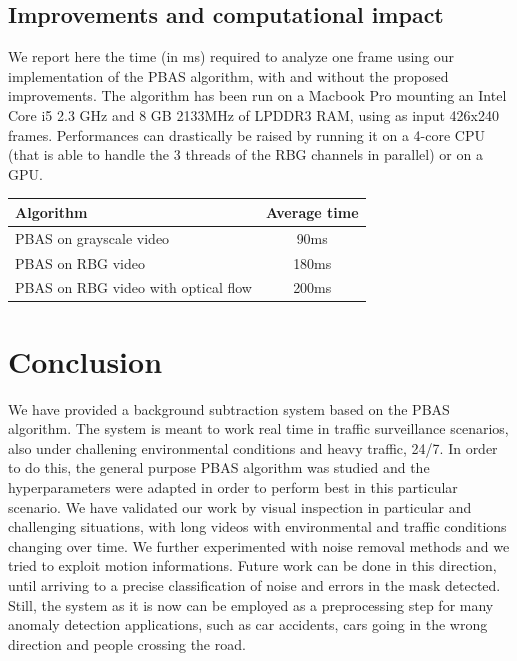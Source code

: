 \subsection*{Improvements and computational impact}
We report here the time (in ms) required to analyze one frame using our implementation of the PBAS algorithm, with and without the proposed improvements. The algorithm has been run on a Macbook Pro mounting an Intel Core i5 2.3 GHz and 8 GB 2133MHz of LPDDR3 RAM, using as input 426x240 frames. Performances can drastically be raised by running it on a 4-core CPU (that is able to handle the 3 threads of the RBG channels in parallel) or on a GPU.

\begin{table}[]
\begin{tabular}{l|c}
    Algorithm                                     & Average time \\
    \hline
    PBAS on grayscale video                       & 90ms         \\
    PBAS on RBG video                             & 180ms        \\
    PBAS on RBG video with optical flow   & 200ms        
\end{tabular}
\end{table}

\section*{Conclusion}
We have provided a background subtraction system based on the PBAS algorithm. The system is meant to work real time in traffic surveillance scenarios, also under challening environmental conditions and heavy traffic, 24/7. In order to do this, the general purpose PBAS algorithm was studied and the hyperparameters were adapted in order to perform best in this particular scenario. We have validated our work by visual inspection in particular and challenging situations, with long videos with environmental and traffic conditions changing over time. We further experimented with noise removal methods and we tried to exploit motion informations. Future work can be done in this direction, until arriving to a precise classification of noise and errors in the mask detected. Still, the system as it is now can be employed as a preprocessing step for many anomaly detection applications, such as car accidents, cars going in the wrong direction and people crossing the road.